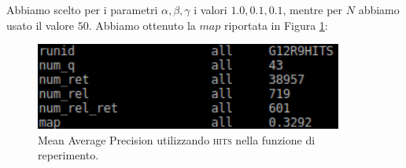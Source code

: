\documentclass[12pt]{article}
\begin{document}
Abbiamo scelto per i parametri $\alpha, \beta, \gamma$ i valori $1.0, 0.1, 0.1$, mentre per $N$ abbiamo usato il valore $50$. Abbiamo ottenuto la $map$ riportata in Figura \ref{fig:tre}:
\begin{figure}[htbp]
	\begin{center}
		\includegraphics[width=0.9\textwidth]{../snapshot2.png}
		\caption{Mean Average Precision utilizzando \textsc{hits} nella funzione di reperimento.}
		\label{fig:tre}
	\end{center}
\end{figure}



\end{document}
